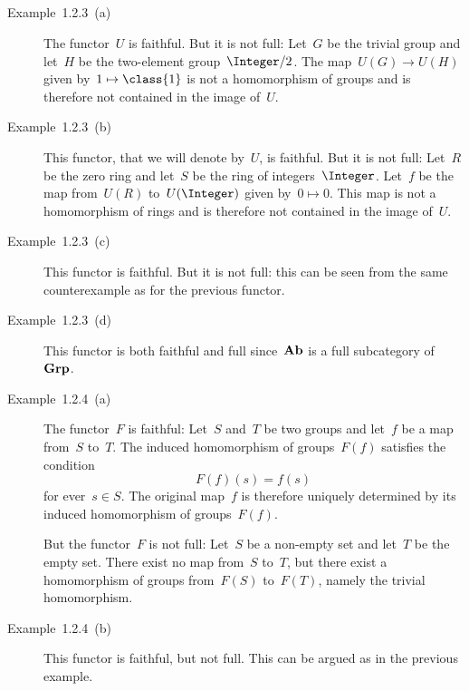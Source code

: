 \subsection{}





\subsubsection{}

\begin{description}
	
	\item[Example~1.2.3~(a)]
		The functor~$U$ is faithful.
		But it is not full:
		Let~$G$ be the trivial group and let~$H$ be the two-element group~$\Integer/2$.
		The map~$U(G) \to U(H)$ given by~$1 \mapsto \class{1}$ is not a homomorphism of groups and is therefore not contained in the image of~$U$.

	\item[Example~1.2.3~(b)]
		This functor, that we will denote by~$U$, is faithful.
		But it is not full:
		Let~$R$ be the zero ring and let~$S$ be the ring of integers~$\Integer$.
		Let~$f$ be the map from~$U(R)$ to~$U(\Integer)$ given by~$0 \mapsto 0$.
		This map is not a homomorphism of rings and is therefore not contained in the image of~$U$.

	\item[Example~1.2.3~(c)]
		This functor is faithful.
		But it is not full:
		this can be seen from the same counterexample as for the previous functor.

	\item[Example~1.2.3~(d)]
		This functor is both faithful and full since~$\mathbf{Ab}$ is a full subcategory of~$\mathbf{Grp}$.

	\item[Example~1.2.4~(a)]
		The functor~$F$ is faithful:
		Let~$S$ and~$T$ be two groups and let~$f$ be a map from~$S$ to~$T$.
		The induced homomorphism of groups~$F(f)$ satisfies the condition
		\[
			F(f)(s)
			=
			f(s)
		\]
		for ever~$s \in S$.
		The original map~$f$ is therefore uniquely determined by its induced homomorphism of groups~$F(f)$.

		But the functor~$F$ is not full:
		Let~$S$ be a non-empty set and let~$T$ be the empty set.
		There exist no map from~$S$ to~$T$, but there exist a homomorphism of groups from~$F(S)$ to~$F(T)$, namely the trivial homomorphism.

	\item[Example~1.2.4~(b)]
		This functor is faithful, but not full.
		This can be argued as in the previous example.


\end{description}
